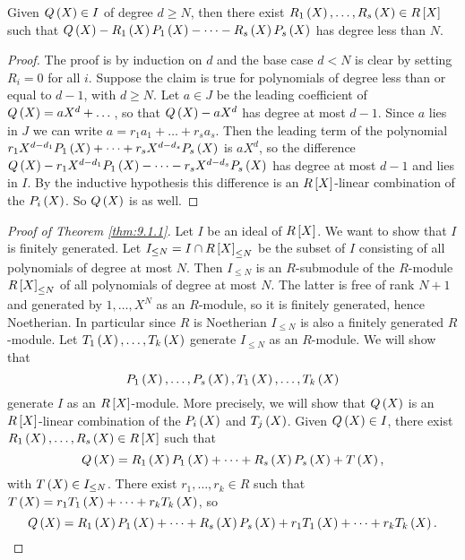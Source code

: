 \begin{lemma}
Given $ Q\br{X} \in I $ of degree $ d \ge N $, then there exist $ R_1\br{X}, \dots, R_s\br{X} \in R\sbr{X} $ such that $ Q\br{X} - R_1\br{X}P_1\br{X} - \dots - R_s\br{X}P_s\br{X} $ has degree less than $ N $.
\end{lemma}

\begin{proof}
The proof is by induction on $ d $ and the base case $ d < N $ is clear by setting $ R_i = 0 $ for all $ i $. Suppose the claim is true for polynomials of degree less than or equal to $ d - 1 $, with $ d \ge N $. Let $ a \in J $ be the leading coefficient of $ Q\br{X} = aX^d + \dots $, so that $ Q\br{X} - aX^d $ has degree at most $ d - 1 $. Since $ a $ lies in $ J $ we can write $ a = r_1a_1 + \dots + r_sa_s $. Then the leading term of the polynomial $ r_1X^{d - d_1}P_1\br{X} + \dots + r_sX^{d - d_s}P_s\br{X} $ is $ aX^d $, so the difference $ Q\br{X} - r_1X^{d - d_1}P_1\br{X} - \dots - r_sX^{d - d_s}P_s\br{X} $ has degree at most $ d - 1 $ and lies in $ I $. By the inductive hypothesis this difference is an $ R\sbr{X} $-linear combination of the $ P_i\br{X} $. So $ Q\br{X} $ is as well.
\end{proof}

\begin{proof}[Proof of Theorem \ref{thm:9.1.1}]
Let $ I $ be an ideal of $ R\sbr{X} $. We want to show that $ I $ is finitely generated. Let $ I_{\le N} = I \cap R\sbr{X}_{\le N} $ be the subset of $ I $ consisting of all polynomials of degree at most $ N $. Then $ I_{\le N} $ is an $ R $-submodule of the $ R $-module $ R\sbr{X}_{\le N} $ of all polynomials of degree at most $ N $. The latter is free of rank $ N + 1 $ and generated by $ 1, \dots, X^N $ as an $ R $-module, so it is finitely generated, hence Noetherian. In particular since $ R $ is Noetherian $ I_{\le N} $ is also a finitely generated $ R $-module. Let $ T_1\br{X}, \dots, T_k\br{X} $ generate $ I_{\le N} $ as an $ R $-module. We will show that
$$ P_1\br{X}, \dots, P_s\br{X}, T_1\br{X}, \dots, T_k\br{X} $$
generate $ I $ as an $ R\sbr{X} $-module. More precisely, we will show that $ Q\br{X} $ is an $ R\sbr{X} $-linear combination of the $ P_i\br{X} $ and $ T_j\br{X} $. Given $ Q\br{X} \in I $, there exist $ R_1\br{X}, \dots, R_s\br{X} \in R\sbr{X} $ such that
$$ Q\br{X} = R_1\br{X}P_1\br{X} + \dots + R_s\br{X}P_s\br{X} + T\br{X}, $$
with $ T\br{X} \in I_{\le N} $. There exist $ r_1, \dots, r_k \in R $ such that $ T\br{X} = r_1T_1\br{X} + \dots + r_kT_k\br{X} $, so
$$ Q\br{X} = R_1\br{X}P_1\br{X} + \dots + R_s\br{X}P_s\br{X} + r_1T_1\br{X} + \dots + r_kT_k\br{X}. $$
\end{proof}


